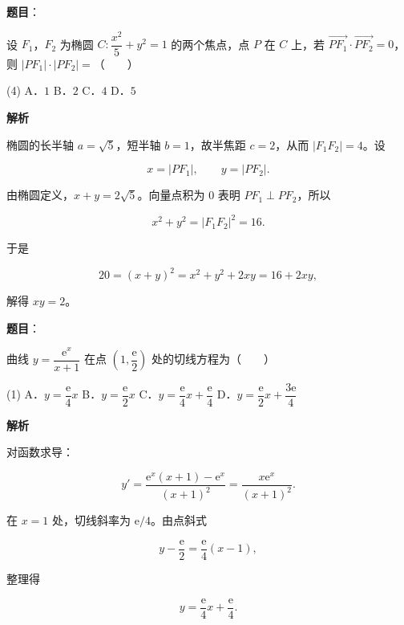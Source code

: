 \begin{answer}

\textbf{题目}：

设 $F_1$，$F_2$ 为椭圆 $C:\dfrac{x^2}{5}+y^2=1$ 的两个焦点，点 $P$ 在 $C$ 上，若 $\overrightarrow{PF_1}\cdot\overrightarrow{PF_2}=0$，则 $|PF_1|\cdot|PF_2|=$\mbox{（　　）}

\begin{gkopts}(4)
\task A．$1$
\task B．$2$
\task C．$4$
\task D．$5$
\end{gkopts}

\textbf{解析}

椭圆的长半轴 $a=\sqrt5$，短半轴 $b=1$，故半焦距 $c=2$，从而 $|F_1F_2|=4$。设

\nopagebreak[4]
\[
x=|PF_1|,\qquad y=|PF_2|.
\]

由椭圆定义，$x+y=2\sqrt5$。向量点积为 $0$ 表明 $PF_1\perp PF_2$，所以

\nopagebreak[4]
\[
x^2+y^2=|F_1F_2|^2=16.
\]

于是

\nopagebreak[4]
\[
20=(x+y)^2=x^2+y^2+2xy=16+2xy,
\]

解得 $xy=2$。


\end{answer}
\begin{answer}

\textbf{题目}：

曲线 $y=\dfrac{\mathrm e^x}{x+1}$ 在点 $\left(1,\dfrac{\mathrm e}{2}\right)$ 处的切线方程为\mbox{（　　）}

\begin{gkopts}(1)
\task A．$y=\dfrac{\mathrm e}{4}x$
\task B．$y=\dfrac{\mathrm e}{2}x$
\task C．$y=\dfrac{\mathrm e}{4}x+\dfrac{\mathrm e}{4}$
\task D．$y=\dfrac{\mathrm e}{2}x+\dfrac{3\mathrm e}{4}$
\end{gkopts}

\textbf{解析}

对函数求导：

\nopagebreak[4]
\[
y'=\frac{\mathrm e^x(x+1)-\mathrm e^x}{(x+1)^2}
=\frac{x\mathrm e^x}{(x+1)^2}.
\]

在 $x=1$ 处，切线斜率为 $\mathrm e/4$。由点斜式

\nopagebreak[4]
\[
y-\frac{\mathrm e}{2}=\frac{\mathrm e}{4}(x-1),
\]

整理得

\nopagebreak[4]
\[
y=\frac{\mathrm e}{4}x+\frac{\mathrm e}{4}.
\]


\end{answer}
